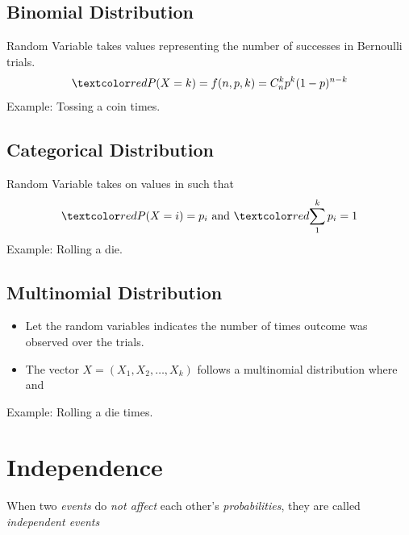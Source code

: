 \documentclass[
	number={3},
	title={Na\"iive Bayes Learning}
]{cs584notes}
\begin{document}
\subsection{Binomial Distribution}\label{subsec:binomial-distribution}
Random Variable  takes values  representing the number of successes  in  Bernoulli trials.
\[ \data{ P(X = k) = f(n, p, k) = C_{n}^{k}p^{k}(1 - p)^{n-k} } \]
Example: Tossing a coin  times.

\subsection{Categorical Distribution}\label{subsec:categorical-distribution}
Random Variable  takes on values in  such that
\[ \data{ P(X = i) = p_{i} } \mbox{ and } \data{ \sum_{1}^{k} p_{i} = 1 } \]
Example: Rolling a die.

\subsection{Multinomial Distribution}\label{subsec:multinomial-distribution}
\begin{itemize}
	\item Let the random variables  indicates the number of times outcome  was observed over the  trials.
	\item The vector $X=(X_{1}, X_{2}, \dots, X_{k})$ follows a multinomial distribution  where  and 
\end{itemize}
Example: Rolling a die  times.

\section{Independence}\label{sec:independence}
When two \emph{events} do \emph{not affect} each other's \emph{probabilities}, they are called \emph{independent events}
\end{document}
